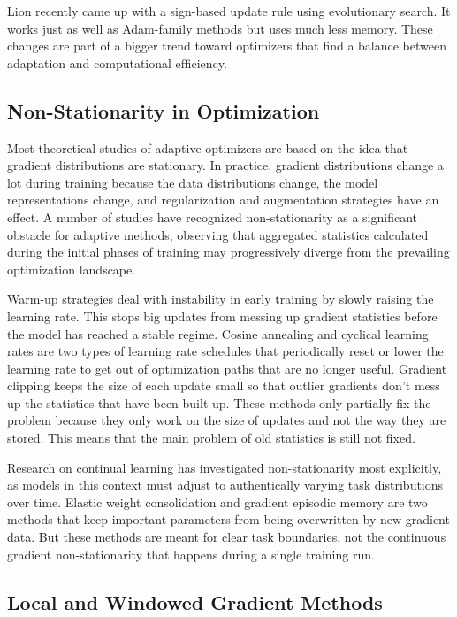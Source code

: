 \documentclass[11pt,a4paper]{article}
\begin{document}
Lion \citep{chen2023lion} recently came up with a sign-based update rule using evolutionary search. It works just as well as Adam-family methods but uses much less memory. These changes are part of a bigger trend toward optimizers that find a balance between adaptation and computational efficiency.

\subsection{Non-Stationarity in Optimization}

Most theoretical studies of adaptive optimizers are based on the idea that gradient distributions are stationary. In practice, gradient distributions change a lot during training because the data distributions change, the model representations change, and regularization and augmentation strategies have an effect. A number of studies have recognized non-stationarity as a significant obstacle for adaptive methods, observing that aggregated statistics calculated during the initial phases of training may progressively diverge from the prevailing optimization landscape.

Warm-up strategies deal with instability in early training by slowly raising the learning rate. This stops big updates from messing up gradient statistics before the model has reached a stable regime. Cosine annealing and cyclical learning rates \citep{loshchilov2016cosine} are two types of learning rate schedules that periodically reset or lower the learning rate to get out of optimization paths that are no longer useful. Gradient clipping \citep{pascanu2013clipping} keeps the size of each update small so that outlier gradients don't mess up the statistics that have been built up. These methods only partially fix the problem because they only work on the size of updates and not the way they are stored. This means that the main problem of old statistics is still not fixed.

Research on continual learning has investigated non-stationarity most explicitly, as models in this context must adjust to authentically varying task distributions over time. Elastic weight consolidation \citep{kirkpatrick2017ewc} and gradient episodic memory are two methods that keep important parameters from being overwritten by new gradient data. But these methods are meant for clear task boundaries, not the continuous gradient non-stationarity that happens during a single training run.

\subsection{Local and Windowed Gradient Methods}
\end{document}

